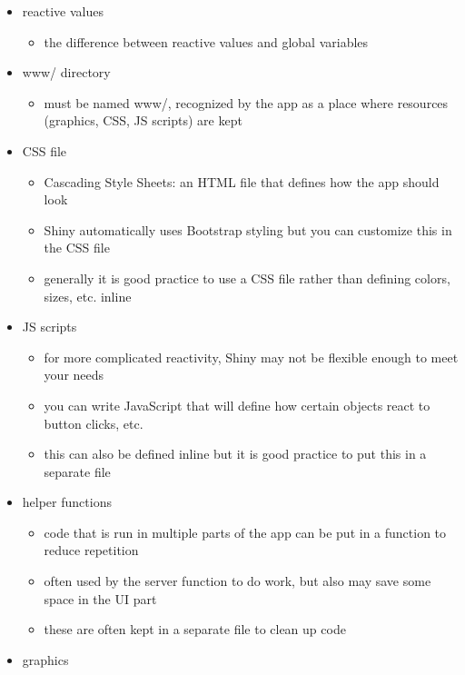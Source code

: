\documentclass[]{article}
\providecommand{\tightlist}{%
  \setlength{\itemsep}{0pt}\setlength{\parskip}{0pt}}
\begin{document}
\begin{itemize}
  \begin{itemize}
  \tightlist
  \item
    reactive values

    \begin{itemize}
    \tightlist
    \item
      the difference between reactive values and global variables
    \end{itemize}
  \item
    www/ directory

    \begin{itemize}
    \tightlist
    \item
      must be named www/, recognized by the app as a place where
      resources (graphics, CSS, JS scripts) are kept
    \end{itemize}
  \item
    CSS file

    \begin{itemize}
    \tightlist
    \item
      Cascading Style Sheets: an HTML file that defines how the app
      should look
    \item
      Shiny automatically uses Bootstrap styling but you can customize
      this in the CSS file
    \item
      generally it is good practice to use a CSS file rather than
      defining colors, sizes, etc. inline
    \end{itemize}
  \item
    JS scripts

    \begin{itemize}
    \tightlist
    \item
      for more complicated reactivity, Shiny may not be flexible enough
      to meet your needs
    \item
      you can write JavaScript that will define how certain objects
      react to button clicks, etc.
    \item
      this can also be defined inline but it is good practice to put
      this in a separate file
    \end{itemize}
  \item
    helper functions

    \begin{itemize}
    \tightlist
    \item
      code that is run in multiple parts of the app can be put in a
      function to reduce repetition
    \item
      often used by the server function to do work, but also may save
      some space in the UI part
    \item
      these are often kept in a separate file to clean up code
    \end{itemize}
  \item
    graphics


\end{itemize}
\end{itemize}
\end{document}
